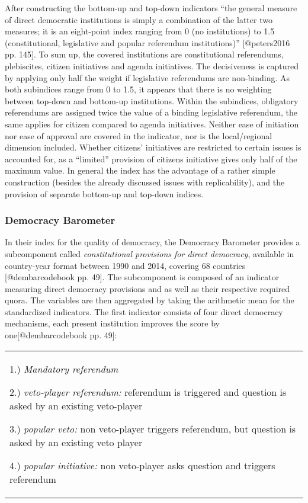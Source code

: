 \documentclass[]{article}
\begin{document}
After constructing the bottom-up and top-down indicators ``the general
measure of direct democratic institutions is simply a combination of the
latter two measures; it is an eight-point index ranging from 0 (no
institutions) to 1.5 (constitutional, legislative and popular referendum
institutions)'' {[}@peters2016 pp. 145{]}. To sum up, the covered
institutions are constitutional referendums, plebiscites, citizen
initiatives and agenda initiatives. The decisiveness is captured by
applying only half the weight if legislative referendums are
non-binding. As both subindices range from 0 to 1.5, it appears that
there is no weighting between top-down and bottom-up institutions.
Within the subindices, obligatory referendums are assigned twice the
value of a binding legislative referendum, the same applies for citizen
compared to agenda initiatives. Neither ease of initiation nor ease of
approval are covered in the indicator, nor is the local/regional
dimension included. Whether citizens' initiatives are restricted to
certain issues is accounted for, as a ``limited'' provision of citizens
initiative gives only half of the maximum value. In general the index
has the advantage of a rather simple construction (besides the already
discussed issues with replicability), and the provision of separate
bottom-up and top-down indices.

\subsubsection{Democracy Barometer}\label{democracy-barometer}

In their index for the quality of democracy, the Democracy Barometer
provides a subcomponent called \emph{constitutional provisions for
direct democracy}, available in country-year format between 1990 and
2014, covering 68 countries {[}@dembarcodebook pp. 49{]}. The
subcomponent is composed of an indicator measuring direct democracy
provisions and as well as their respective required quora. The variables
are then aggregated by taking the arithmetic mean for the standardized
indicators. The first indicator consists of four direct democracy
mechanisms, each present institution improves the score by
one{[}@dembarcodebook pp. 49{]}:

\vspace{0.02cm}

\begin{tabular}{p{12.5cm}}
\footnotesize
    1.) \textit{Mandatory referendum} 
    
    2.) \textit{veto-player referendum:} referendum is triggered and question is asked by an existing veto-player
    
    3.) \textit{popular veto:} non veto-player triggers referendum, but question is asked by an existing veto player
    
    4.) \textit{popular initiative:} non veto-player asks question and triggers referendum
\end{tabular}
\end{document}
